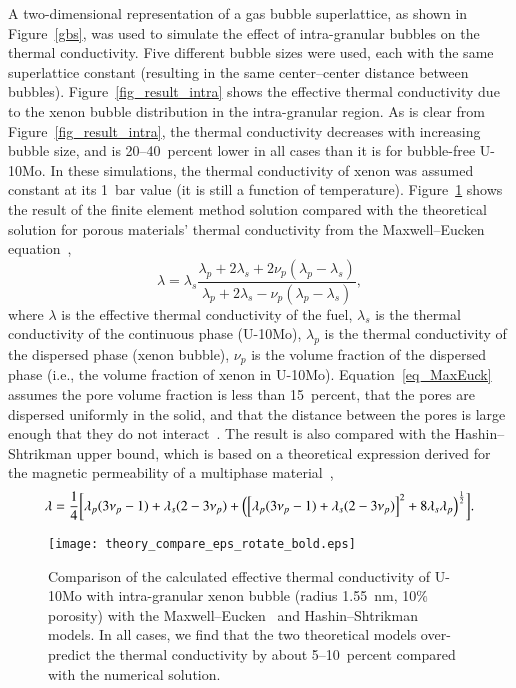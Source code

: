 A two-dimensional representation of a gas bubble superlattice, as shown in
Figure~\ref{gbs}, was used to simulate the effect of intra-granular bubbles on the thermal conductivity.
Five different bubble sizes were used, each with the same superlattice
constant (resulting in the same center--center distance between bubbles).
Figure~\ref{fig_result_intra} shows the effective thermal conductivity due to the xenon bubble distribution in the intra-granular region.
As is clear from Figure~\ref{fig_result_intra}, the thermal conductivity decreases with increasing bubble size, and is 20--40~percent lower in all cases than it is for bubble-free U-10Mo. In these simulations, the thermal conductivity of xenon was assumed constant at its 1~bar value (it is still a function of temperature).
Figure~\ref{fig_compare} shows the result of the finite element method solution compared with the theoretical solution for porous materials' thermal conductivity from the Maxwell--Eucken equation~\cite{maxwell1881treatise}, 
\begin{equation}
	\lambda = \lambda_s\frac{\lambda_p+2\lambda_s+2\nu_p(\lambda_p-\lambda_s)}{\lambda_p+2\lambda_s-\nu_p(\lambda_p-\lambda_s)},
	\label{eq_MaxEuck}
\end{equation}
where $\lambda$ is the effective thermal conductivity of the fuel, $\lambda_s$ is the thermal conductivity of the continuous phase (U-10Mo), $\lambda_p$ is the thermal conductivity of the dispersed phase (xenon bubble), $\nu_p$ is the volume fraction of the dispersed phase (i.e., the volume fraction of xenon in U-10Mo). Equation~\eqref{eq_MaxEuck} assumes the pore volume fraction is less than 15~percent, that the pores are dispersed uniformly in the solid, and that the distance between the pores is large enough that they do not interact~\cite{clark2003monolithic,smith2013thermal}. The result is also compared with the Hashin--Shtrikman upper bound, which is based on a theoretical expression derived for the magnetic permeability of a multiphase material~\cite{hashin1962variational},
\begin{equation}
\lambda = \frac{1}{4}\biggl[ \lambda_p(3\nu_p-1) + \lambda_s(2-3\nu_p) + \Bigl( \left[ \lambda_p (3\nu_p -1) + \lambda_s(2-3\nu_p) \right]^2 + 8\lambda_s\lambda_p \Bigr)^{\frac{1}{2}}
    \biggr].
\label{eq:Hash-Sht}
\end{equation}

\begin{figure}%
	\centering
	\texttt{[image: theory\_compare\_eps\_rotate\_bold.eps]}
	\caption[Comparison of thermal conductivities with theoretical models]{Comparison of the calculated effective thermal conductivity of U-10Mo with intra-granular xenon bubble (radius 1.55~nm, 10$\%$ porosity) with the Maxwell--Eucken~\cite{maxwell1881treatise} and Hashin--Shtrikman~\cite{hashin1962variational} models. In all cases, we find that the
      two theoretical models over-predict the thermal conductivity by about
      5--10~percent compared with the numerical solution.}
	\label{fig_compare}
\end{figure}

